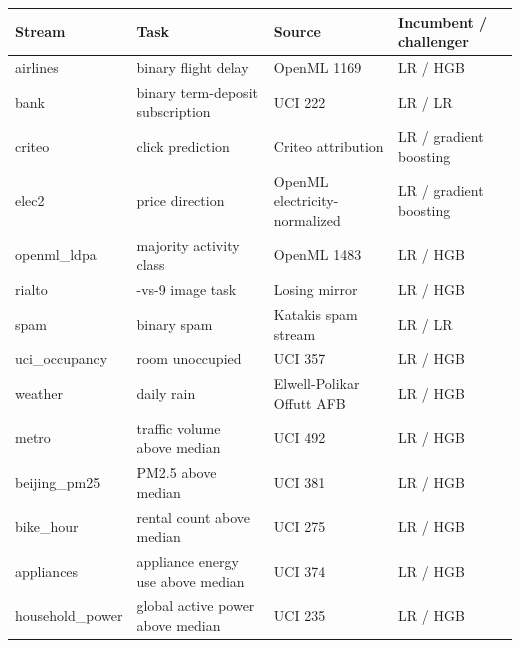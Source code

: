 \begin{tabular}{@{}>{\raggedright\arraybackslash}p{2.5cm}>{\raggedright\arraybackslash}p{4.1cm}>{\raggedright\arraybackslash}p{3.6cm}>{\raggedright\arraybackslash}p{3.4cm}@{}}
\toprule
Stream & Task & Source & Incumbent / challenger \\
\midrule
airlines & binary flight delay & OpenML 1169 & LR / HGB \\
bank & binary term-deposit subscription & UCI 222 & LR / LR \\
criteo & click prediction & Criteo attribution & LR / gradient boosting \\
elec2 & price direction & OpenML electricity-normalized & LR / gradient boosting \\
openml\_ldpa & majority activity class & OpenML 1483 & LR / HGB \\
rialto & 1-vs-9 image task & Losing mirror & LR / HGB \\
spam & binary spam & Katakis spam stream & LR / LR \\
uci\_occupancy & room unoccupied & UCI 357 & LR / HGB \\
weather & daily rain & Elwell-Polikar Offutt AFB & LR / HGB \\
\midrule
metro & traffic volume above median & UCI 492 & LR / HGB \\
beijing\_pm25 & PM2.5 above median & UCI 381 & LR / HGB \\
bike\_hour & rental count above median & UCI 275 & LR / HGB \\
appliances & appliance energy use above median & UCI 374 & LR / HGB \\
household\_power & global active power above median & UCI 235 & LR / HGB \\
\bottomrule
\end{tabular}
